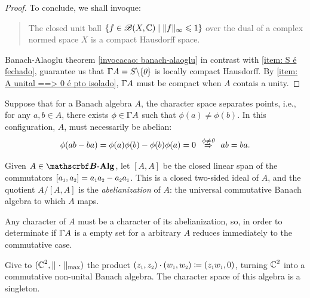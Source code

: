 \begin{lema}
\begin{proof}
To conclude, we shall invoque:
\begin{quote}
    \begin{invocacao}
    \label{invocacao: banach-alaoglu}
    The closed unit ball $\{f\in \mathscr B(X,\operatorname{\mathbb{C}}) \mid \|f\|_\infty \leqslant 1\}$ over the dual of a complex normed space $X$ is a compact Hausdorff space.
\end{invocacao}
\end{quote}
Banach-Alaoglu theorem \ref{invocacao: banach-alaoglu} in contrast with \ref{item: S é fechado}, guarantee us that ${{\GGamma}{A}} = S\backslash \{\hspace{-0.05cm}\textit{0}\}$ is locally compact Hausdorff. By \ref{item: A unital ==> 0 é pto isolado}, ${{\GGamma}{A}}$ must be compact when $A$ contais a unity.
\end{proof}
\end{lema}

\begin{exemplo}
Suppose that for a Banach algebra $A$, the character space separates points, i.e., for any $a,b \in A$, there exists $\phi \in \GGamma{A}$ such that $\phi(a)\neq \phi(b)$. In this configuration, $A$, must necessarily be abelian:
\[
\phi(ab - ba) = \phi(a)\phi(b)-\phi(b)\phi(a) = 0 \overset{\phi\neq \textit{0}}{\hspace{0.25cm} \Rightarrow \hspace{0.25cm}} ab=ba.
\]
\end{exemplo}


\begin{exemplo}
Given $A\in \BAlg$, let $[A,A]$ be the closed linear span of the commutators $[\sub a1,\sub a2]=\sub a1\sub a2-\sub a2\sub a1$. This is a closed two-sided ideal of $A$, and the quotient $A/[A,A]$ is the \textit{abelianization} of $A$: the universal commutative Banach algebra to which $A$ maps.

Any character of $A$ must be a character of its abelianization, so, in order to determinate if $\GGamma{A}$ is a empty set for a arbitrary $A$ reduces immediately to the commutative case. 
\end{exemplo}

\begin{exemplo}
Give to $(\operatorname{\mathbb{C}}^2,\|\operatorname{\,\cdot\,}\|_{\operatorname{max}})$ the product $(\sub z1,\sub z2)\cdot (\sub w1, \sub w2) \coloneqq (\sub z1\sub w1,0)$, turning $\operatorname{\mathbb{C}}^2$ into a commutative non-unital Banach algebra. The character space of this algebra is a singleton.
\end{exemplo}

